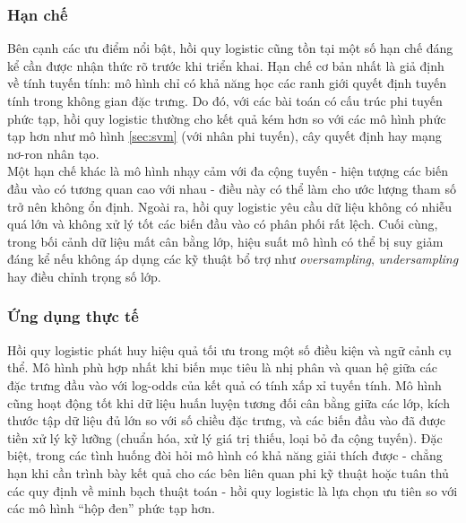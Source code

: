 \subsubsection{Hạn chế}
 
Bên cạnh các ưu điểm nổi bật, hồi quy logistic cũng tồn tại một số hạn chế đáng kể cần được nhận thức rõ trước khi triển khai. Hạn chế cơ bản nhất là giả định về tính tuyến tính: mô hình chỉ có khả năng học các ranh giới quyết định tuyến tính trong không gian đặc trưng. Do đó, với các bài toán có cấu trúc phi tuyến phức tạp, hồi quy logistic thường cho kết quả kém hơn so với các mô hình phức tạp hơn như mô hình \ref{sec:svm} (với nhân phi tuyến), cây quyết định hay mạng nơ-ron nhân tạo.\\
 
Một hạn chế khác là mô hình nhạy cảm với đa cộng tuyến - hiện tượng các biến đầu vào có tương quan cao với nhau - điều này có thể làm cho ước lượng tham số trở nên không ổn định. Ngoài ra, hồi quy logistic yêu cầu dữ liệu không có nhiễu quá lớn và không xử lý tốt các biến đầu vào có phân phối rất lệch. Cuối cùng, trong bối cảnh dữ liệu mất cân bằng lớp, hiệu suất mô hình có thể bị suy giảm đáng kể nếu không áp dụng các kỹ thuật bổ trợ như \textit{oversampling}, \textit{undersampling} hay điều chỉnh trọng số lớp.\\
 
\subsubsection{Ứng dụng thực tế}

Hồi quy logistic phát huy hiệu quả tối ưu trong một số điều kiện và ngữ cảnh cụ thể. Mô hình phù hợp nhất khi biến mục tiêu là nhị phân và quan hệ giữa các đặc trưng đầu vào với log-odds của kết quả có tính xấp xỉ tuyến tính. Mô hình cũng hoạt động tốt khi dữ liệu huấn luyện tương đối cân bằng giữa các lớp, kích thước tập dữ liệu đủ lớn so với số chiều đặc trưng, và các biến đầu vào đã được tiền xử lý kỹ lưỡng (chuẩn hóa, xử lý giá trị thiếu, loại bỏ đa cộng tuyến). Đặc biệt, trong các tình huống đòi hỏi mô hình có khả năng giải thích được - chẳng hạn khi cần trình bày kết quả cho các bên liên quan phi kỹ thuật hoặc tuân thủ các quy định về minh bạch thuật toán - hồi quy logistic là lựa chọn ưu tiên so với các mô hình ``hộp đen'' phức tạp hơn.\\

